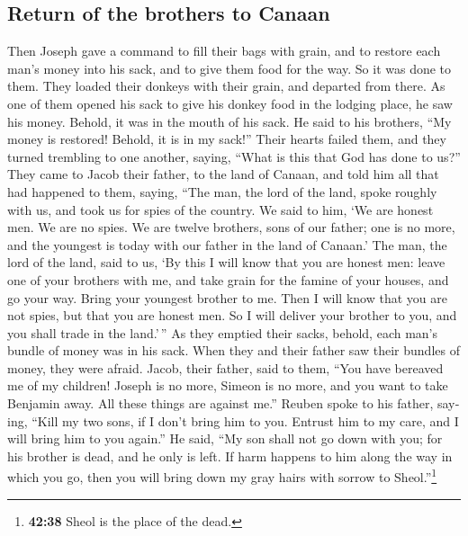 \begin{paracol}{2}
\begin{otherlanguage}{english}
\hypertarget{return-of-the-brothers-to-canaan}{%
\subsection{Return of the brothers to
Canaan}\label{return-of-the-brothers-to-canaan}}

 Then Joseph gave a command to fill their bags with
grain, and to restore each man's money into his sack, and to give them
food for the way. So it was done to them.  They loaded
their donkeys with their grain, and departed from there. 
As one of them opened his sack to give his donkey food in the lodging
place, he saw his money. Behold, it was in the mouth of his sack.
 He said to his brothers, ``My money is restored! Behold,
it is in my sack!'' Their hearts failed them, and they turned trembling
to one another, saying, ``What is this that God has done to us?''
 They came to Jacob their father, to the land of Canaan,
and told him all that had happened to them, saying, 
``The man, the lord of the land, spoke roughly with us, and took us for
spies of the country.  We said to him, `We are honest
men. We are no spies.  We are twelve brothers, sons of
our father; one is no more, and the youngest is today with our father in
the land of Canaan.'  The man, the lord of the land, said
to us, `By this I will know that you are honest men: leave one of your
brothers with me, and take grain for the famine of your houses, and go
your way.  Bring your youngest brother to me. Then I will
know that you are not spies, but that you are honest men. So I will
deliver your brother to you, and you shall trade in the land.'\,''
 As they emptied their sacks, behold, each man's bundle
of money was in his sack. When they and their father saw their bundles
of money, they were afraid.  Jacob, their father, said to
them, ``You have bereaved me of my children! Joseph is no more, Simeon
is no more, and you want to take Benjamin away. All these things are
against me.''  Reuben spoke to his father, saying, ``Kill
my two sons, if I don't bring him to you. Entrust him to my care, and I
will bring him to you again.''  He said, ``My son shall
not go down with you; for his brother is dead, and he only is left. If
harm happens to him along the way in which you go, then you will bring
down my gray hairs with sorrow to Sheol.''\footnote{\textbf{42:38} Sheol
  is the place of the dead.}


\end{otherlanguage}
\end{paracol}
